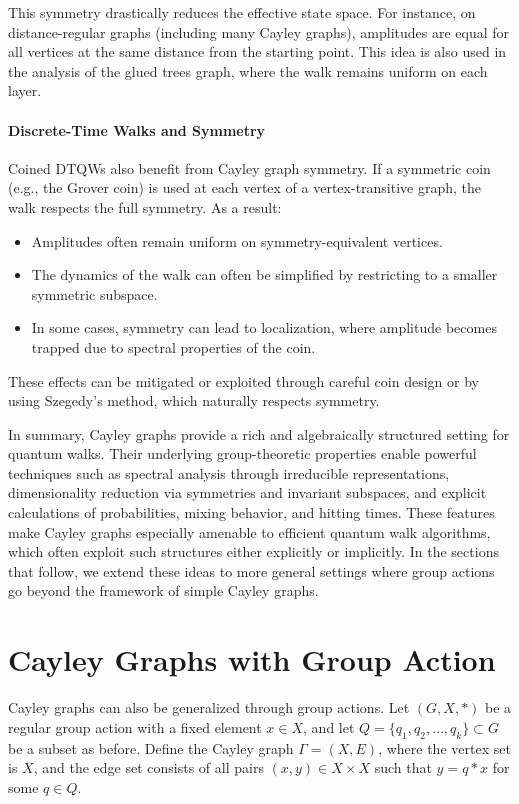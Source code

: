\documentclass[12pt]{report}
\begin{document}
This symmetry drastically reduces the effective state space. For instance, on distance-regular graphs (including many Cayley graphs), amplitudes are equal for all vertices at the same distance from the starting point. This idea is also used in the analysis of the glued trees graph, where the walk remains uniform on each layer.


\paragraph{Discrete-Time Walks and Symmetry}
Coined DTQWs also benefit from Cayley graph symmetry. If a symmetric coin (e.g., the Grover coin) is used at each vertex of a vertex-transitive graph, the walk respects the full symmetry. As a result:
\begin{itemize}
    \item Amplitudes often remain uniform on symmetry-equivalent vertices.
    \item The dynamics of the walk can often be simplified by restricting to a smaller symmetric subspace.
    \item In some cases, symmetry can lead to localization, where amplitude becomes trapped due to spectral properties of the coin.
\end{itemize}
These effects can be mitigated or exploited through careful coin design or by using Szegedy’s method, which naturally respects symmetry.

In summary, Cayley graphs provide a rich and algebraically structured setting for quantum walks. Their underlying group-theoretic properties enable powerful techniques such as spectral analysis through irreducible representations, dimensionality reduction via symmetries and invariant subspaces, and explicit calculations of probabilities, mixing behavior, and hitting times. These features make Cayley graphs especially amenable to efficient quantum walk algorithms, which often exploit such structures either explicitly or implicitly. In the sections that follow, we extend these ideas to more general settings where group actions go beyond the framework of simple Cayley graphs.




\section{Cayley Graphs with Group Action}


Cayley graphs can also be generalized through group actions. Let \( (G, X, *) \) be a regular group action with a fixed element \( x \in X \), and let \( Q = \{q_1, q_2, \dots, q_k\} \subset G \) be a subset as before. Define the Cayley graph \( \Gamma = (X, E) \), where the vertex set is \( X \), and the edge set consists of all pairs \( (x, y) \in X \times X \) such that \( y = q * x \) for some \( q \in Q \).
\end{document}
